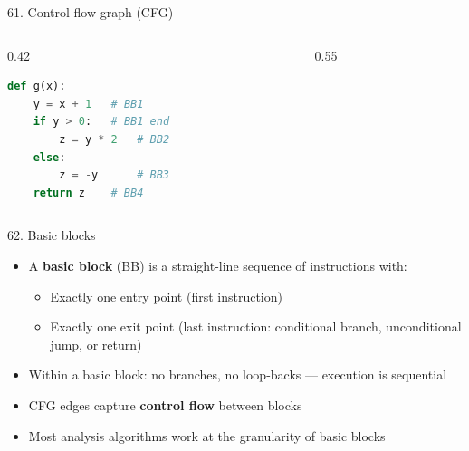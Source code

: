\documentclass[aspectratio=169]{beamer}
\begin{document}
\begin{frame}[fragile]{61. Control flow graph (CFG)}
\begin{columns}
\begin{column}{0.42\textwidth}
\begin{lstlisting}[language=Python]
def g(x):
    y = x + 1   # BB1
    if y > 0:   # BB1 end
        z = y * 2   # BB2
    else:
        z = -y      # BB3
    return z    # BB4
\end{lstlisting}
\end{column}
\begin{column}{0.55\textwidth}
\end{column}
\end{columns}
\end{frame}

\begin{frame}{62. Basic blocks}
\begin{itemize}
  \item A \textbf{basic block} (BB) is a straight-line sequence of instructions with:
    \begin{itemize}
      \item Exactly one entry point (first instruction)
      \item Exactly one exit point (last instruction: conditional branch, unconditional jump, or return)
    \end{itemize}
  \item Within a basic block: no branches, no loop-backs --- execution is sequential
  \item CFG edges capture \textbf{control flow} between blocks
  \item Most analysis algorithms work at the granularity of basic blocks
\end{itemize}
\end{frame}
\end{document}
